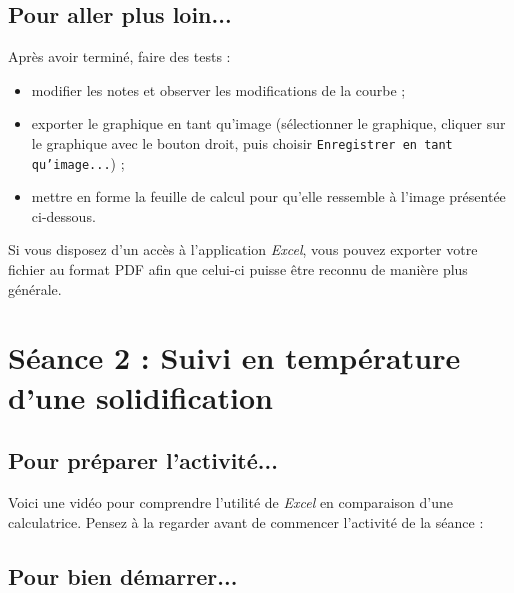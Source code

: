 \subsection{Pour aller plus loin...}

Après avoir terminé, faire des tests :

\begin{itemize}
\item modifier les notes et observer les modifications de la courbe ;
\item exporter le graphique en tant qu'image (sélectionner le graphique, cliquer sur le graphique avec le bouton droit, puis choisir \texttt{Enregistrer en tant qu'image...}) ;
\item mettre en forme la feuille de calcul pour qu'elle ressemble à l'image présentée ci-dessous.
\end{itemize}


Si vous disposez d'un accès à l'application \emph{Excel}, vous pouvez exporter votre fichier au format PDF afin que celui-ci puisse être reconnu de manière plus générale.


\newpage

%
%
%
%




\section{Séance 2 : Suivi en température d'une solidification}\label{ficheTableur2}

\subsection{Pour préparer l'activité...}

Voici une vidéo pour comprendre l'utilité de \emph{Excel} en comparaison d'une calculatrice. Pensez à la regarder avant de commencer l'activité de la séance :

\begin{center}
\end{center}

\subsection{Pour bien démarrer...}

